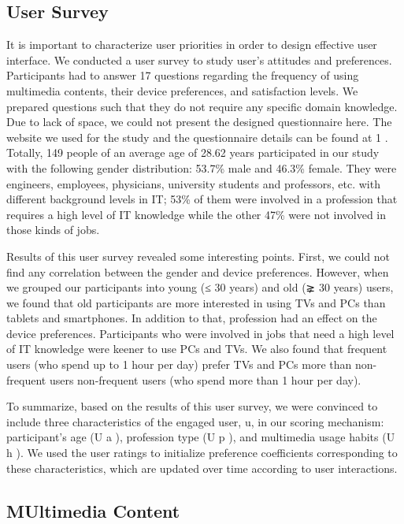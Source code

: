 \documentclass[runningheads,a4paper]{llncs}
\begin{document}
\subsection{User Survey}

It is important to characterize user priorities in order to design effective user
interface. We conducted a user survey to study user’s attitudes and preferences.
Participants had to answer 17 questions regarding the frequency of using multimedia contents, their device preferences, and satisfaction levels. We prepared
questions such that they do not require any specific domain knowledge. Due to
lack of space, we could not present the designed questionnaire here. The website
we used for the study and the questionnaire details can be found at 1
. Totally,
149 people of an average age of 28.62 years participated in our study with the
following gender distribution: 53.7\% male and 46.3\% female. They were engineers, employees, physicians, university students and professors, etc. with different background levels in IT; 53\% of them were involved in a profession that
requires a high level of IT knowledge while the other 47\% were not involved in
those kinds of jobs.



Results of this user survey revealed some interesting points. First, we could
not find any correlation between the gender and device preferences. However,
when we grouped our participants into young (≤ 30 years) and old (⪈ 30 years)
users, we found that old participants are more interested in using TVs and PCs
than tablets and smartphones. In addition to that, profession had an effect on
the device preferences. Participants who were involved in jobs that need a high
level of IT knowledge were keener to use PCs and TVs. We also found that
frequent users (who spend up to 1 hour per day) prefer TVs and PCs more than
non-frequent users non-frequent users (who spend more than 1 hour per day).



To summarize, based on the results of this user survey, we were convinced to
include three characteristics of the engaged user, u, in our scoring mechanism:
participant’s age (U
a
), profession type (U
p
), and multimedia usage habits (U
h
).
We used the user ratings to initialize preference coefficients corresponding to
these characteristics, which are updated over time according to user interactions.



\subsection{MUltimedia Content}
\end{document}
